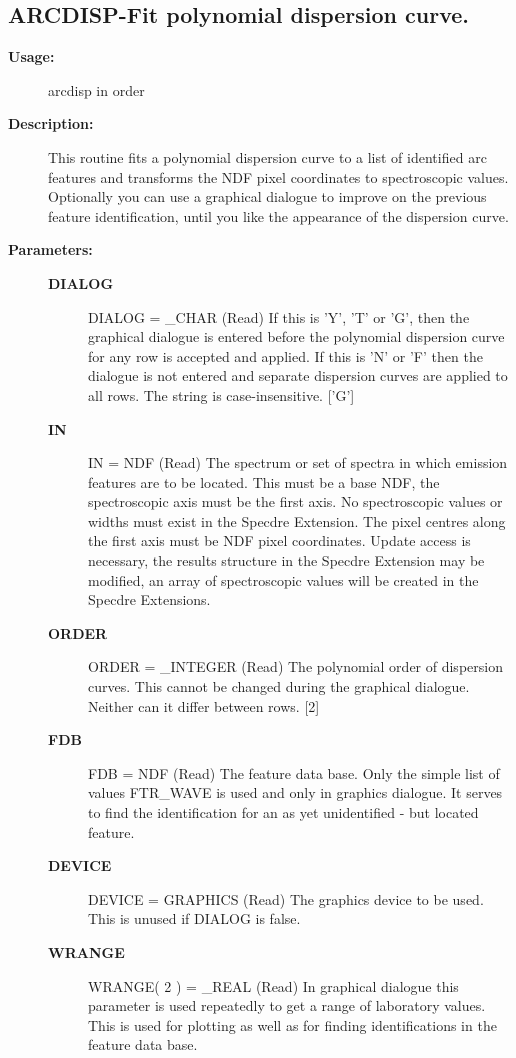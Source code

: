 \subsection{ARCDISP-\label{ARCDISP}Fit polynomial dispersion curve.}
\begin{description}

\item [{\bf Usage:}]

   arcdisp in order


\item [{\bf Description:}]
   This routine fits a polynomial dispersion curve to a list of
   identified arc features and transforms the NDF pixel coordinates
   to spectroscopic values. Optionally you can use a graphical
   dialogue to improve on the previous feature identification, until
   you like the appearance of the dispersion curve.


\item [{\bf Parameters:}]
\begin{description}
\item [{\bf DIALOG}]
DIALOG = _CHAR (Read)
   If this is 'Y', 'T' or 'G', then the graphical dialogue is
   entered before the polynomial dispersion curve for any row is
   accepted and applied. If this is 'N' or 'F' then the dialogue
   is not entered and separate dispersion curves are applied to
   all rows. The string is case-insensitive. ['G']
\item [{\bf IN}]
IN = NDF (Read)
   The spectrum or set of spectra in which emission features are
   to be located. This must be a base NDF, the spectroscopic axis
   must be the first axis. No spectroscopic values or widths must
   exist in the Specdre Extension. The pixel centres along the
   first axis must be NDF pixel coordinates. Update access is
   necessary, the results structure in the Specdre Extension may
   be modified, an array of spectroscopic values will be created
   in the Specdre Extensions.
\item [{\bf ORDER}]
ORDER = _INTEGER (Read)
   The polynomial order of dispersion curves. This cannot be changed
   during the graphical dialogue. Neither can it differ between
   rows.  [2]
\item [{\bf FDB}]
FDB = NDF (Read)
   The feature data base. Only the simple list of values FTR_WAVE is
   used and only in graphics dialogue. It serves to find the
   identification for an as yet unidentified - but located
   feature.
\item [{\bf DEVICE}]
DEVICE = GRAPHICS (Read)
   The graphics device to be used. This is unused if DIALOG is
   false.
\item [{\bf WRANGE}]
WRANGE( 2 ) = _REAL (Read)
   In graphical dialogue this parameter is used repeatedly to get
   a range of laboratory values. This is used for plotting as well
   as for finding identifications in the feature data base.


\end{description}
\end{description}
